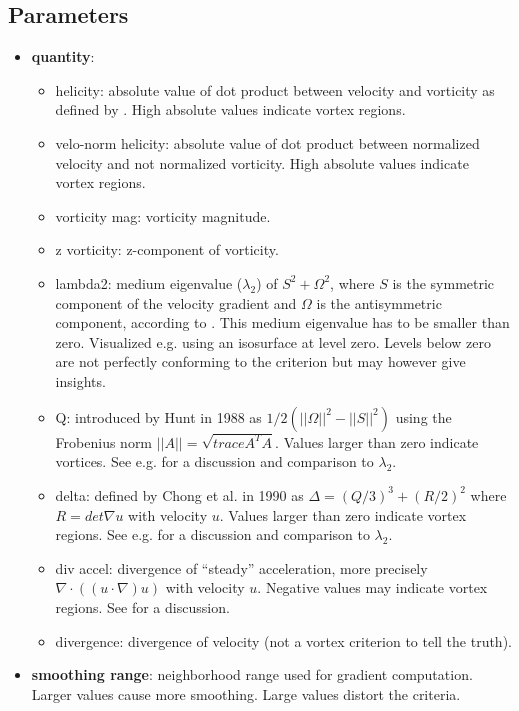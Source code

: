 \subsection{Parameters}
\begin{itemize}

\item
  \textbf{quantity}:
  \begin{itemize}
  \item
    helicity:
absolute value of
dot product between velocity and vorticity as defined by \cite{Moffatt1969}. High absolute values indicate vortex regions.
  \item
    velo-norm helicity:
absolute value of
dot product between normalized velocity and not normalized vorticity. High absolute values indicate vortex regions.
  \item
    vorticity mag: vorticity magnitude.
  \item
    z vorticity: z-component of vorticity.
  \item
    lambda2: medium eigenvalue ($\lambda_2$) of $S^2 + \Omega^2$, where $S$ is the symmetric component of the velocity gradient and $\Omega$ is the antisymmetric component, according to \cite{JeongH95}. This medium eigenvalue has to be smaller than zero. Visualized e.g. using an isosurface at level zero. Levels below zero are not perfectly conforming to the criterion but may however give insights.
  \item
    Q: introduced by Hunt in 1988 \cite{HuntWM88} as $1/2 (||\Omega||^2 - ||S||^2)$ using the Frobenius norm $||A|| = \sqrt{trace A^T A}$. Values larger than zero indicate vortices. See e.g. \cite{JeongH95} for a discussion and comparison to $\lambda_2$.
  \item
    delta: defined by Chong et al. in 1990 \cite{ChongPC90} as $\Delta = (Q/3)^3 + (R/2)^2$ where $R = det \nabla u$ with velocity $u$. Values larger than zero indicate vortex regions. See e.g. \cite{JeongH95} for a discussion and comparison to $\lambda_2$.
  \item
    div accel: divergence of ``steady'' acceleration, more precisely $\nabla \cdot ((u \cdot \nabla) u)$ with velocity $u$. Negative values may indicate vortex regions. See \cite{GotoV04} for a discussion.
  \item
    divergence: divergence of velocity (not a vortex criterion to tell the truth).
  \end{itemize}

\item
  \textbf{smoothing range}: neighborhood range used for gradient computation. Larger values cause more smoothing. Large values distort the criteria.

\end{itemize}


